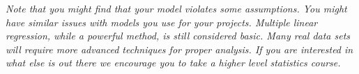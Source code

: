 \documentclass[11pt]{article}
\begin{document}
$\:$ \\

\textit{Note that you might find that your model violates some assumptions. You might  have similar issues with models you use for your projects. Multiple linear regression, while a powerful method, is still considered basic. Many real data sets will require more advanced techniques for proper analysis. If you are interested in what else is out there we encourage you to take a higher level statistics course.}

\vfill



%
%
%
%
%
%
%
%
%
%


\end{document}
